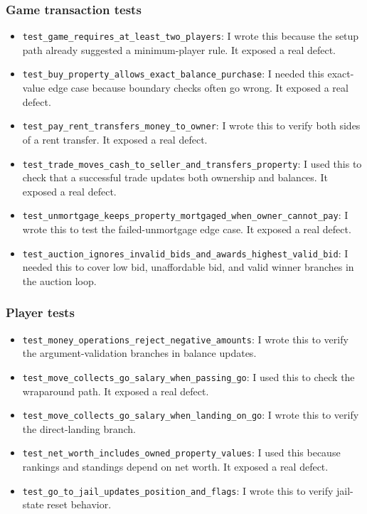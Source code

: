 \documentclass[12pt]{article}
\begin{document}
\subsubsection*{Game transaction tests}
\begin{itemize}
  \item \texttt{test\_game\_requires\_at\_least\_two\_players}: I wrote this because the setup path already suggested a minimum-player rule. It exposed a real defect.
  \item \texttt{test\_buy\_property\_allows\_exact\_balance\_purchase}: I needed this exact-value edge case because boundary checks often go wrong. It exposed a real defect.
  \item \texttt{test\_pay\_rent\_transfers\_money\_to\_owner}: I wrote this to verify both sides of a rent transfer. It exposed a real defect.
  \item \texttt{test\_trade\_moves\_cash\_to\_seller\_and\_transfers\_property}: I used this to check that a successful trade updates both ownership and balances. It exposed a real defect.
  \item \texttt{test\_unmortgage\_keeps\_property\_mortgaged\_when\_owner\_cannot\_pay}: I wrote this to test the failed-unmortgage edge case. It exposed a real defect.
  \item \texttt{test\_auction\_ignores\_invalid\_bids\_and\_awards\_highest\_valid\_bid}: I needed this to cover low bid, unaffordable bid, and valid winner branches in the auction loop.
\end{itemize}

\subsubsection*{Player tests}
\begin{itemize}
  \item \texttt{test\_money\_operations\_reject\_negative\_amounts}: I wrote this to verify the argument-validation branches in balance updates.
  \item \texttt{test\_move\_collects\_go\_salary\_when\_passing\_go}: I used this to check the wraparound path. It exposed a real defect.
  \item \texttt{test\_move\_collects\_go\_salary\_when\_landing\_on\_go}: I wrote this to verify the direct-landing branch.
  \item \texttt{test\_net\_worth\_includes\_owned\_property\_values}: I used this because rankings and standings depend on net worth. It exposed a real defect.
  \item \texttt{test\_go\_to\_jail\_updates\_position\_and\_flags}: I wrote this to verify jail-state reset behavior.
\end{itemize}
\end{document}
